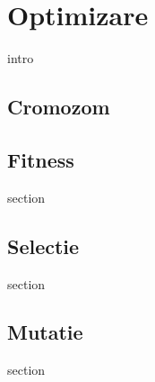 \chapter{Optimizare}

intro

\section{Cromozom}

\section{Fitness}

section

\section{Selectie}
 
section 

\section{Mutatie}

section
